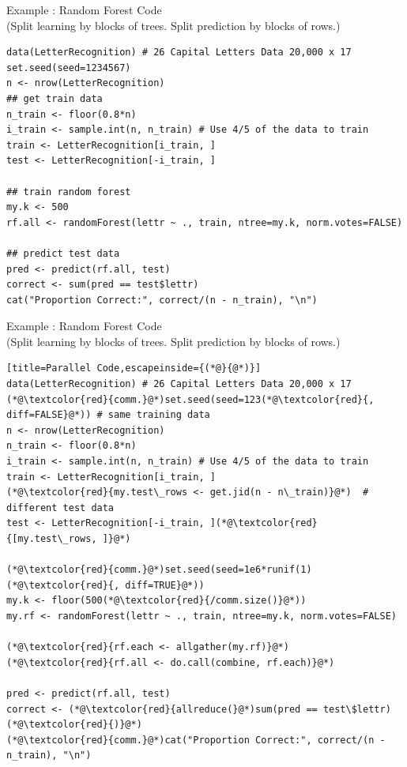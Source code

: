 \begin{frame}[fragile]
  \begin{exampleblock}{Example \showex :  Random Forest Code \\
      (Split learning by blocks of trees. Split prediction by blocks
      of rows.)}\pause
    \begin{lstlisting}[title=Serial Code]
data(LetterRecognition) # 26 Capital Letters Data 20,000 x 17
set.seed(seed=1234567)
n <- nrow(LetterRecognition)
## get train data
n_train <- floor(0.8*n)
i_train <- sample.int(n, n_train) # Use 4/5 of the data to train
train <- LetterRecognition[i_train, ]
test <- LetterRecognition[-i_train, ]

## train random forest
my.k <- 500
rf.all <- randomForest(lettr ~ ., train, ntree=my.k, norm.votes=FALSE)

## predict test data
pred <- predict(rf.all, test)
correct <- sum(pred == test$lettr)
cat("Proportion Correct:", correct/(n - n_train), "\n")
    \end{lstlisting} %
  \end{exampleblock}
\end{frame}


\begin{frame}[fragile]
  \begin{exampleblock}{Example \showex :  Random Forest Code \\
      (Split learning by blocks of trees. Split prediction by blocks
      of rows.)}\pause
    \begin{lstlisting}[title=Parallel Code,escapeinside={(*@}{@*)}]
data(LetterRecognition) # 26 Capital Letters Data 20,000 x 17
(*@\textcolor{red}{comm.}@*)set.seed(seed=123(*@\textcolor{red}{, diff=FALSE}@*)) # same training data
n <- nrow(LetterRecognition)
n_train <- floor(0.8*n)
i_train <- sample.int(n, n_train) # Use 4/5 of the data to train
train <- LetterRecognition[i_train, ]
(*@\textcolor{red}{my.test\_rows <- get.jid(n - n\_train)}@*)  # different test data
test <- LetterRecognition[-i_train, ](*@\textcolor{red}{[my.test\_rows, ]}@*)

(*@\textcolor{red}{comm.}@*)set.seed(seed=1e6*runif(1)(*@\textcolor{red}{, diff=TRUE}@*))
my.k <- floor(500(*@\textcolor{red}{/comm.size()}@*))
my.rf <- randomForest(lettr ~ ., train, ntree=my.k, norm.votes=FALSE)

(*@\textcolor{red}{rf.each <- allgather(my.rf)}@*)
(*@\textcolor{red}{rf.all <- do.call(combine, rf.each)}@*)

pred <- predict(rf.all, test)
correct <- (*@\textcolor{red}{allreduce(}@*)sum(pred == test\$lettr)(*@\textcolor{red}{)}@*)
(*@\textcolor{red}{comm.}@*)cat("Proportion Correct:", correct/(n - n_train), "\n")
    \end{lstlisting} %
  \end{exampleblock}
\end{frame}